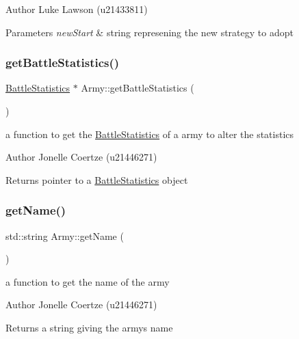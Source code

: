 \begin{DoxyAuthor}{Author}
Luke Lawson (u21433811) 
\end{DoxyAuthor}

\begin{DoxyParams}{Parameters}
{\em new\+Start} & string represening the new strategy to adopt \\
\hline
\end{DoxyParams}
\mbox{\label{class_army_afc9db890d8daf5eedd176a532b4a801e}} 
\subsubsection{\texorpdfstring{getBattleStatistics()}{getBattleStatistics()}}
{\footnotesize\ttfamily \mbox{\hyperlink{class_battle_statistics}{Battle\+Statistics}} $\ast$ Army\+::get\+Battle\+Statistics (\begin{DoxyParamCaption}{ }\end{DoxyParamCaption})}



a function to get the \mbox{\hyperlink{class_battle_statistics}{Battle\+Statistics}} of a army to alter the statistics 

\begin{DoxyAuthor}{Author}
Jonelle Coertze (u21446271) 
\end{DoxyAuthor}
\begin{DoxyReturn}{Returns}
pointer to a \mbox{\hyperlink{class_battle_statistics}{Battle\+Statistics}} object 
\end{DoxyReturn}
\mbox{\label{class_army_a23b0ec0aa78d6b30a9d18b73ebd38d28}} 
\subsubsection{\texorpdfstring{getName()}{getName()}}
{\footnotesize\ttfamily std\+::string Army\+::get\+Name (\begin{DoxyParamCaption}{ }\end{DoxyParamCaption})}



a function to get the name of the army 

\begin{DoxyAuthor}{Author}
Jonelle Coertze (u21446271) 
\end{DoxyAuthor}
\begin{DoxyReturn}{Returns}
a string giving the army\textquotesingle{}s name 
\end{DoxyReturn}
\mbox{\label{class_army_a970b4df6878127a902c04df760c8ea5d}} 
